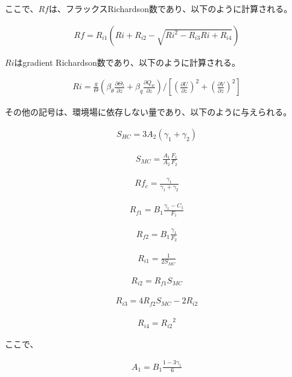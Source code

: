 ここで、\(Rf\)は、フラックスRichardson数であり、以下のように計算される。

\begin{eqnarray}Rf=R_{i1}\left(Ri+R_{i2}-\sqrt{Ri^2-R_{i3}Ri+R_{i4}}\right)\end{eqnarray}

\(Ri\)はgradient Richardson数であり、以下のように計算される。

\begin{eqnarray}Ri=\frac{g}{\Theta}\left(\beta_\theta \frac{\partial \Theta_l}{\partial z}+\beta_q \frac{\partial Q_w}{\partial z}\right) \Bigg/ \left[ \left(\frac{\partial U}{\partial z}\right)^2+\left(\frac{\partial V}{\partial z}\right)^2 \right]\end{eqnarray}

その他の記号は、環境場に依存しない量であり、以下のように与えられる。

\begin{eqnarray}S_{HC}=3A_2(\gamma_1+\gamma_2)\end{eqnarray}

\begin{eqnarray}S_{MC}=\frac{A_1}{A_2}\frac{F_1}{F_2}\end{eqnarray}

\begin{eqnarray}Rf_c=\frac{\gamma_1}{\gamma_1+\gamma_2}\end{eqnarray}

\begin{eqnarray}R_{f1}=B_1\frac{\gamma_1-C_1}{F_1}\end{eqnarray}

\begin{eqnarray}R_{f2}=B_1\frac{\gamma_1}{F_2}\end{eqnarray}

\begin{eqnarray}R_{i1}=\frac{1}{2S_{MC}}\end{eqnarray}

\begin{eqnarray}R_{i2}=R_{f1}S_{MC}\end{eqnarray}

\begin{eqnarray}R_{i3}=4R_{f2}S_{MC}-2R_{i2}\end{eqnarray}

\begin{eqnarray}R_{i4}={R_{i2}}^2\end{eqnarray}

ここで、

\begin{eqnarray}A_1=B_1\frac{1-3\gamma_1}{6}\end{eqnarray}

